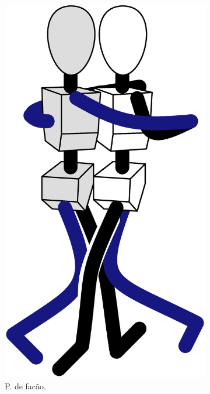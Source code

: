 \begin{figure}[!ht]
\begin{subfigure}[b]{0.19475\textwidth}
         \centering
         \includegraphics[width=\textwidth]{chapters/cap-normas/position-facao.eps}
         \caption{P. de facão.}
         \label{fig:positiongeralsamba:facao}
     \end{subfigure}
     \hfill
     \begin{subfigure}[b]{0.245\textwidth}
         \centering

\end{subfigure}
\end{figure}
